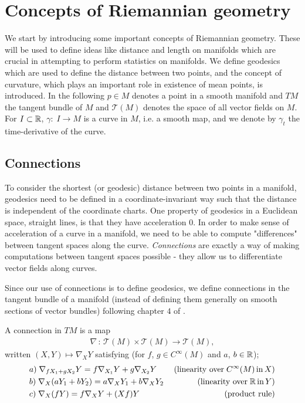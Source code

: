 \section{Concepts of Riemannian geometry}
\label{sec:concepts_of_Riemannian_geometry}

We start by introducing some important concepts of Riemannian geometry. These will be used to define ideas like distance and length on manifolds which are crucial in attempting to perform statistics on manifolds. We define geodesics which are used to define the distance between two points, and the concept of curvature, which plays an important role in existence of mean points, is introduced. In the following $p \in M$ denotes a point in a smooth manifold and $TM$ the tangent bundle of $M$ and $\mathcal{T}(M)$ denotes the space of all vector fields on $M$. For $I \subset \mathbb{R}$, $\gamma: \; I \rightarrow M$ is a curve in $M$, i.e. a smooth map, and we denote by $\gamma_t$ the time-derivative of the curve.

\subsection{Connections}

To consider the shortest (or geodesic) distance between two points in a manifold, geodesics need to be defined in a coordinate-invariant way such that the distance is independent of the coordinate charts. One property of geodesics in a Euclidean space, straight lines, is that they have acceleration $0$. In order to make sense of acceleration of a curve in a manifold, we need to be able to compute "differences" between tangent spaces along the curve. \textit{Connections} are exactly a way of making computations between tangent spaces possible - they allow us to differentiate vector fields along curves.

Since our use of connections is to define geodesics, we define connections in the tangent bundle of a manifold (instead of defining them generally on smooth sections of vector bundles) following chapter $4$ of \cite{lee2006riemannian}.

\begin{definition}
A connection in $TM$ is a map
\begin{align*}
\nabla \, : \, \mathcal{T}(M) \times \mathcal{T}(M) \rightarrow \mathcal{T}(M),
\end{align*}
written $(X, Y) \mapsto \nabla_X Y$ satisfying (for $f$, $g \in C^\infty(M)$ and $a$, $b \in \mathbb{R}$);
\begin{align*}
& a) \; \nabla_{fX_1 + gX_2} Y = f\nabla_{X_1} Y + g\nabla_{X_2} Y \; \; \; \; & \text{(linearity over} \; C^\infty(M) \, \text{in} \, X) \\
& b) \; \nabla_X (aY_1 + bY_2) = a\nabla_X Y_1 + b\nabla_X Y_2 & \text{(linearity over} \; \mathbb{R} \, \text{in} \, Y) \\
& c) \; \nabla_X (fY) = f\nabla_X Y + (Xf)Y & \text{(product rule)}
\end{align*}
\end{definition}

